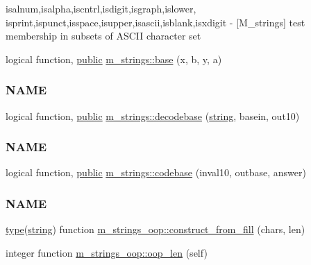 \begin{DoxyCompactItemize}
\begin{DoxyCompactList}
isalnum,isalpha,iscntrl,isdigit,isgraph,islower, isprint,ispunct,isspace,isupper,isascii,isblank,isxdigit -\/ \mbox{[}M\+\_\+strings\mbox{]} test membership in subsets of A\+S\+C\+II character set \end{DoxyCompactList}\item 
logical function, \hyperlink{M__stopwatch_83_8txt_a2f74811300c361e53b430611a7d1769f}{public} \hyperlink{namespacem__strings_a635ef6f1dd73400e7b339392886d6357}{m\+\_\+strings\+::base} (x, b, y, a)
\begin{DoxyCompactList}\small\item\em \subsubsection*{N\+A\+ME}\end{DoxyCompactList}\item 
logical function, \hyperlink{M__stopwatch_83_8txt_a2f74811300c361e53b430611a7d1769f}{public} \hyperlink{namespacem__strings_a90f3bdfa02c8ddff42cb15e66b124fe8}{m\+\_\+strings\+::decodebase} (\hyperlink{what__overview_81_8txt_a74cb7e955273b9f9157b4f0c18a38849}{string}, basein, out10)
\begin{DoxyCompactList}\small\item\em \subsubsection*{N\+A\+ME}\end{DoxyCompactList}\item 
logical function, \hyperlink{M__stopwatch_83_8txt_a2f74811300c361e53b430611a7d1769f}{public} \hyperlink{namespacem__strings_a3a022b64dc902dc6043e3f265ee78e38}{m\+\_\+strings\+::codebase} (inval10, outbase, answer)
\begin{DoxyCompactList}\small\item\em \subsubsection*{N\+A\+ME}\end{DoxyCompactList}\item 
\hyperlink{stop__watch_83_8txt_a70f0ead91c32e25323c03265aa302c1c}{type}(\hyperlink{what__overview_81_8txt_a74cb7e955273b9f9157b4f0c18a38849}{string}) function \hyperlink{namespacem__strings__oop_a411874cce2f16fee4d05d7528b510703}{m\+\_\+strings\+\_\+oop\+::construct\+\_\+from\+\_\+fill} (chars, len)
\item 
integer function \hyperlink{namespacem__strings__oop_a768ea13372aadbeae760c72d0b2a1939}{m\+\_\+strings\+\_\+oop\+::oop\+\_\+len} (self)

\end{DoxyCompactItemize}
